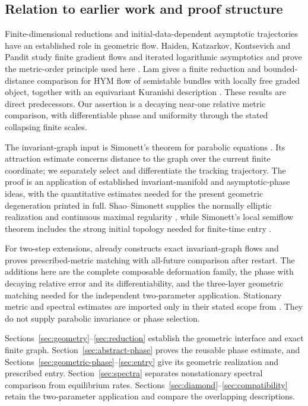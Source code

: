 \documentclass[11pt]{amsart}
\theoremstyle{definition}
\theoremstyle{remark}
\begin{document}
\subsection{Relation to earlier work and proof structure}
Finite-dimensional reductions and initial-data-dependent asymptotic
trajectories have an established role in geometric flow.
Haiden, Katzarkov, Kontsevich and Pandit study finite gradient
flows and iterated logarithmic asymptotics and prove the
metric-order principle used here \cite{HKKP18}.
Lam gives a finite reduction and bounded-distance comparison
for HYM flow of semistable bundles with locally free graded
object, together with an equivariant Kuranishi description
\cite[Proposition 8.6 and Theorem 8.7]{Lam26}.
These results are direct predecessors. Our assertion is a
decaying near-one relative metric comparison, with differentiable
phase and uniformity through the stated collapsing finite scales.

The invariant-graph input is Simonett's theorem for parabolic
equations \cite[Theorem 2.1]{Simonett94}. Its attraction estimate
concerns distance to the graph over the current finite coordinate;
we separately select and differentiate the tracking trajectory.
The proof is an application of established invariant-manifold
and asymptotic-phase ideas, with the quantitative estimates
needed for the present geometric degeneration printed in full.
Shao--Simonett supplies the normally elliptic realization and
continuous maximal regularity \cite{ShaoSimonett14}, while
Simonett's local semiflow theorem includes the strong initial
topology needed for finite-time entry \cite{Simonett95}.

For two-step extensions, \cite[Sections 6 and 8]{WuebbenFlow26}
already constructs exact invariant-graph flows and proves
prescribed-metric matching with all-future comparison after
restart. The additions here are the complete composable
deformation family, the phase with decaying relative error and
its differentiability, and the three-layer geometric matching
needed for the independent two-parameter application.
Stationary metric and spectral estimates are imported only
in their stated scope from \cite{WuebbenThreeStep26,WuebbenWall26}.
They do not supply parabolic invariance or phase selection.

Sections~\ref{sec:geometry}--\ref{sec:reduction} establish the
geometric interface and exact finite graph.
Section~\ref{sec:abstract-phase} proves the reusable phase
estimate, and Sections~\ref{sec:geometric-phase}--\ref{sec:entry}
give its geometric realization and prescribed entry.
Section~\ref{sec:spectra} separates nonstationary spectral
comparison from equilibrium rates.
Sections~\ref{sec:diamond}--\ref{sec:compatibility} retain the
two-parameter application and compare the overlapping descriptions.
\end{document}

